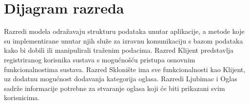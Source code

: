 			\eject
			
			
		\section{Dijagram razreda}
		
			
			
			
			
			
			Razredi modela odražavaju strukturu podataka unutar aplikacije, a metode koje su implementirane unutar njih služe za izravnu komunikaciju s bazom podataka kako bi dobili ili manipulirali traženim podacima. Razred Klijent predstavlja registriranog korisnika sustava s mogućnošću pristupa osnovnim funkcionalnostima sustava. Razred Sklonište ima sve funkcionalnosti kao Klijent, uz dodatnu mogućnost dodavanja kategorija oglasa. Razredi Ljubimac i Oglas sadrže informacije potrebne za stvaranje oglasa koji će biti prikazani svim korisnicima.
			
